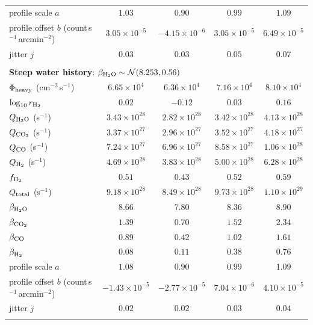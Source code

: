 \begin{table}[!ht]
\begin{tabular}{@{}lcccc@{}}
\addlinespace[3pt]
profile scale $a$ & \(1.03\) & \(0.90\) & \(0.99\) & \(1.09\)\\
profile offset $b$ (count\,s\(^{-1}\)\,arcmin\(^{-2}\)) & \(3.05\times10^{-5}\) & \(-4.15\times10^{-6}\) & \(3.05\times10^{-5}\) & \(6.49\times10^{-5}\)\\
jitter $j$ & \(0.03\) & \(0.03\) & \(0.05\) & \(0.07\)\\
\addlinespace[3pt]
\multicolumn{5}{@{}l@{}}{\hspace{1.5em}\edit{\(\ln\mathcal L(\hat\theta_{\rm MAP}) = 74.67\qquad \ln Z = 62.7\)}}\\
\midrule
\multicolumn{5}{l}{\textbf{Steep water history}: \(\beta_{\rm H_2O}\sim\mathcal N(8.253,0.56)\)}\\
\midrule
\(\Phi_{\rm heavy}\) (cm\(^{-2}\)\,s\(^{-1}\)) & \(6.65\times10^{4}\) & \(6.36\times10^{4}\) & \(7.16\times10^{4}\) & \(8.10\times10^{4}\)\\
\(\log_{10}r_{\rm H_2}\) & \(0.02\) & \(-0.12\) & \(0.03\) & \(0.16\)\\
\(Q_{\rm H_2O}\) (s\(^{-1}\)) & \(3.43\times10^{28}\) & \(2.82\times10^{28}\) & \(3.42\times10^{28}\) & \(4.13\times10^{28}\)\\
\(Q_{\rm CO_2}\) (s\(^{-1}\)) & \(3.37\times10^{27}\) & \(2.96\times10^{27}\) & \(3.52\times10^{27}\) & \(4.18\times10^{27}\)\\
\(Q_{\rm CO}\) (s\(^{-1}\)) & \(7.24\times10^{27}\) & \(6.96\times10^{27}\) & \(8.58\times10^{27}\) & \(1.06\times10^{28}\)\\
\(Q_{\rm H_2}\) (s\(^{-1}\)) & \(4.69\times10^{28}\) & \(3.83\times10^{28}\) & \(5.00\times10^{28}\) & \(6.28\times10^{28}\)\\
\(f_{\rm H_2}\) & \(0.51\) & \(0.43\) & \(0.52\) & \(0.59\)\\
\(Q_{\rm total}\) (s\(^{-1}\)) & \(9.18\times10^{28}\) & \(8.49\times10^{28}\) & \(9.73\times10^{28}\) & \(1.10\times10^{29}\)\\
\(\beta_{\rm H_2O}\) & \(8.66\) & \(7.80\) & \(8.36\) & \(8.90\)\\
\(\beta_{\rm CO_2}\) & \(1.39\) & \(0.70\) & \(1.52\) & \(2.34\)\\
\(\beta_{\rm CO}\) & \(0.89\) & \(0.42\) & \(1.02\) & \(1.61\)\\
\(\beta_{\rm H_2}\) & \(0.08\) & \(0.11\) & \(0.38\) & \(0.76\)\\
\addlinespace[3pt]
profile scale $a$ & \(1.08\) & \(0.90\) & \(0.99\) & \(1.09\)\\
profile offset $b$ (count\,s\(^{-1}\)\,arcmin\(^{-2}\)) & \(-1.43\times10^{-5}\) & \(-2.77\times10^{-5}\) & \(7.04\times10^{-6}\) & \(4.10\times10^{-5}\)\\
jitter $j$ & \(0.02\) & \(0.02\) & \(0.03\) & \(0.04\)\\
\addlinespace[3pt]
\multicolumn{5}{@{}l@{}}{\hspace{1.5em}\edit{\(\ln\mathcal L(\hat\theta_{\rm MAP}) = 79.66\qquad \ln Z = 65.7\)}}\\
\bottomrule
\end{tabular}
\label{tab:results}
\end{table}
